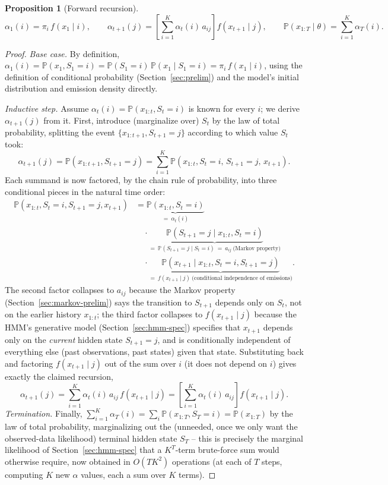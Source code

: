 \documentclass[11pt]{article}
\newtheorem{proposition}[theorem]{Proposition}
\theoremstyle{definition}
\theoremstyle{remark}
\begin{document}
\begin{proposition}[Forward recursion]
\[
\alpha_1(i) = \pi_i\,f(x_1\mid i), \qquad
\alpha_{t+1}(j) = \left[\sum_{i=1}^K \alpha_t(i)\,a_{ij}\right]f(x_{t+1}\mid j), \qquad
\mathbb{P}(x_{1:T}\mid\theta) = \sum_{i=1}^K\alpha_T(i).
\]
\end{proposition}
\begin{proof}
\emph{Base case.} By definition, $\alpha_1(i)=\mathbb{P}(x_1,S_1=i)=\mathbb{P}(S_1=i)\,\mathbb{P}(x_1\mid S_1=i)=\pi_i\,f(x_1\mid i)$, using the definition of conditional probability (Section~\ref{sec:prelim}) and the model's initial distribution and emission density directly.

\emph{Inductive step.} Assume $\alpha_t(i)=\mathbb{P}(x_{1:t},S_t=i)$ is known for every $i$; we derive $\alpha_{t+1}(j)$ from it. First, introduce (marginalize over) $S_t$ by the law of total probability, splitting the event $\{x_{1:t+1},S_{t+1}=j\}$ according to which value $S_t$ took:
\[
\alpha_{t+1}(j) = \mathbb{P}(x_{1:t+1},S_{t+1}=j) = \sum_{i=1}^K \mathbb{P}(x_{1:t},S_t=i,\,S_{t+1}=j,\,x_{t+1}).
\]
Each summand is now factored, by the chain rule of probability, into three conditional pieces in the natural time order:
\begin{align*}
\mathbb{P}(x_{1:t},S_t=i,S_{t+1}=j,x_{t+1})
&= \underbrace{\mathbb{P}(x_{1:t},S_t=i)}_{=\ \alpha_t(i)}\\
&\quad\cdot\underbrace{\mathbb{P}(S_{t+1}=j\mid x_{1:t},S_t=i)}_{=\ \mathbb{P}(S_{t+1}=j\mid S_t=i)\ =\ a_{ij}\ \text{(Markov property)}}\\
&\quad\cdot\underbrace{\mathbb{P}(x_{t+1}\mid x_{1:t},S_t=i,S_{t+1}=j)}_{=\ f(x_{t+1}\mid j)\ \text{(conditional independence of emissions)}}.
\end{align*}
The second factor collapses to $a_{ij}$ because the Markov property (Section~\ref{sec:markov-prelim}) says the transition to $S_{t+1}$ depends only on $S_t$, not on the earlier history $x_{1:t}$; the third factor collapses to $f(x_{t+1}\mid j)$ because the HMM's generative model (Section~\ref{sec:hmm-spec}) specifies that $x_{t+1}$ depends only on the \emph{current} hidden state $S_{t+1}=j$, and is conditionally independent of everything else (past observations, past states) given that state. Substituting back and factoring $f(x_{t+1}\mid j)$ out of the sum over $i$ (it does not depend on $i$) gives exactly the claimed recursion,
\[
\alpha_{t+1}(j) = \sum_{i=1}^K\alpha_t(i)\,a_{ij}\,f(x_{t+1}\mid j) = \left[\sum_{i=1}^K\alpha_t(i)\,a_{ij}\right]f(x_{t+1}\mid j).
\]
\emph{Termination.} Finally, $\sum_{i=1}^K\alpha_T(i)=\sum_i\mathbb{P}(x_{1:T},S_T=i)=\mathbb{P}(x_{1:T})$ by the law of total probability, marginalizing out the (unneeded, once we only want the observed-data likelihood) terminal hidden state $S_T$ -- this is precisely the marginal likelihood of Section~\ref{sec:hmm-spec} that a $K^T$-term brute-force sum would otherwise require, now obtained in $O(TK^2)$ operations (at each of $T$ steps, computing $K$ new $\alpha$ values, each a sum over $K$ terms).
\end{proof}
\end{document}
